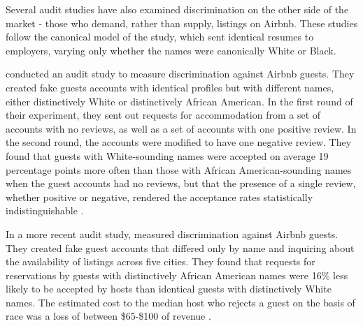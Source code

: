 Several audit studies have also examined discrimination on the other side of the market - those who demand, rather than supply, listings on Airbnb. These studies follow the canonical model of the \cite{bertrand} study, which sent identical resumes to employers, varying only whether the names were canonically White or Black. 

\cite{cui} conducted an audit study to measure discrimination against Airbnb guests. They created fake guests accounts with identical profiles but with different names, either distinctively White or distinctively African American. In the first round of their experiment, they sent out requests for accommodation from a set of accounts with no reviews, as well as a set of accounts with one positive review. In the second round, the accounts were modified to have one negative review. They found that guests with White-sounding names were accepted on average 19 percentage points more often than those with African American-sounding names when the guest accounts had no reviews, but that the presence of a single review, whether positive or negative, rendered the acceptance rates statistically indistinguishable \citep{cui}.

In a more recent audit study, \cite{edelman2} measured discrimination against Airbnb guests. They created fake guest accounts that differed only by name and inquiring about the availability of listings across five cities. They found that requests for reservations by guests with distinctively African American names were 16\% less likely to be accepted by hosts than identical guests with distinctively White names. The estimated cost to the median host who rejects a guest on the basis of race was a loss of between \$65-\$100 of revenue \citep{edelman2}.











